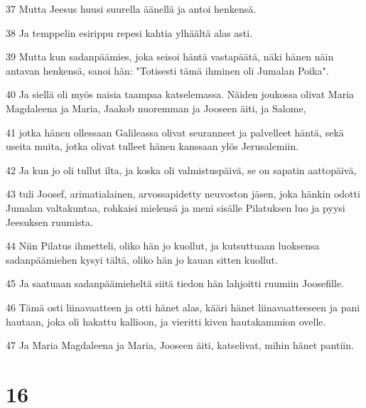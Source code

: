 \par 37 Mutta Jeesus huusi suurella äänellä ja antoi henkensä.
\par 38 Ja temppelin esirippu repesi kahtia ylhäältä alas asti.
\par 39 Mutta kun sadanpäämies, joka seisoi häntä vastapäätä, näki hänen näin antavan henkensä, sanoi hän: "Totisesti tämä ihminen oli Jumalan Poika".
\par 40 Ja siellä oli myös naisia taampaa katselemassa. Näiden joukossa olivat Maria Magdaleena ja Maria, Jaakob nuoremman ja Jooseen äiti, ja Salome,
\par 41 jotka hänen ollessaan Galileassa olivat seuranneet ja palvelleet häntä, sekä useita muita, jotka olivat tulleet hänen kanssaan ylös Jerusalemiin.
\par 42 Ja kun jo oli tullut ilta, ja koska oli valmistuspäivä, se on sapatin aattopäivä,
\par 43 tuli Joosef, arimatialainen, arvossapidetty neuvoston jäsen, joka hänkin odotti Jumalan valtakuntaa, rohkaisi mielensä ja meni sisälle Pilatuksen luo ja pyysi Jeesuksen ruumista.
\par 44 Niin Pilatus ihmetteli, oliko hän jo kuollut, ja kutsuttuaan luoksensa sadanpäämiehen kysyi tältä, oliko hän jo kauan sitten kuollut.
\par 45 Ja saatuaan sadanpäämieheltä siitä tiedon hän lahjoitti ruumiin Joosefille.
\par 46 Tämä osti liinavaatteen ja otti hänet alas, kääri hänet liinavaatteeseen ja pani hautaan, joka oli hakattu kallioon, ja vieritti kiven hautakammion ovelle.
\par 47 Ja Maria Magdaleena ja Maria, Jooseen äiti, katselivat, mihin hänet pantiin.

\chapter{16}

